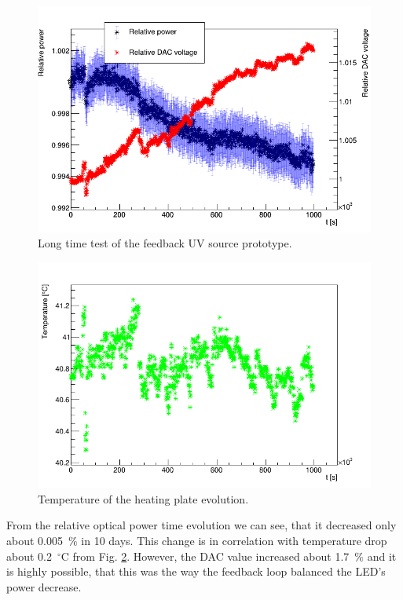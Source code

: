 \begin{figure}[H]
 \centering
 \includegraphics[scale=0.5]{./pictures/LongTime.png}
 \caption{Long time test of the feedback UV source prototype.}
 \label{Long test}
\end{figure}

\begin{figure}[H]
 \centering
 \includegraphics[scale=0.5]{./pictures/LastTemp.png}
 \caption{Temperature of the heating plate evolution.}
 \label{Long test temperatures}
\end{figure}

From the relative optical power time evolution we can see, that it decreased only about 0.005~$\%$ in 10 days. This change is in correlation with temperature drop about 0.2~$^\circ$C from Fig. \ref{Long test temperatures}. However, the DAC value increased about 1.7~$\%$ and it is highly possible, that this was the way the feedback loop balanced the LED's power decrease.

